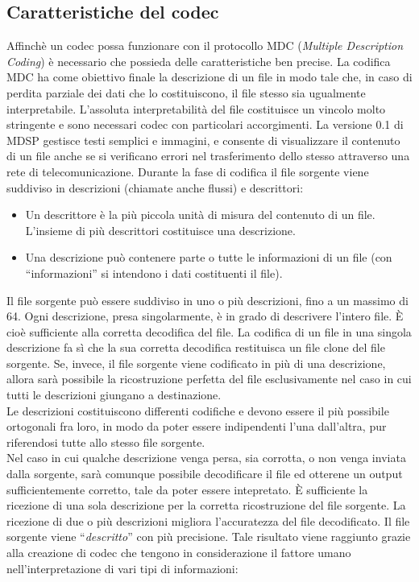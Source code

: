 \subsection{Caratteristiche del codec}
Affinch\`e un codec possa funzionare con il protocollo MDC (\emph{Multiple Description Coding}) è necessario che possieda delle caratteristiche ben precise. La codifica MDC ha come obiettivo finale la descrizione di un file in modo tale che, in caso di perdita parziale dei dati che lo costituiscono, il file stesso sia ugualmente interpretabile. L'assoluta interpretabilit\`a del file costituisce un vincolo molto stringente e sono necessari codec con particolari accorgimenti. La versione 0.1 di MDSP gestisce testi semplici e immagini, e consente di visualizzare il contenuto di un file anche se si verificano errori nel trasferimento dello stesso attraverso una rete di telecomunicazione. Durante la fase di codifica il file sorgente viene suddiviso in descrizioni (chiamate anche flussi) e descrittori:
\begin{itemize}
 \item Un descrittore \`e la pi\`u piccola unit\`a di misura del contenuto di un file. L'insieme di pi\`u descrittori costituisce una descrizione.
 \item Una descrizione pu\`o contenere parte o tutte le informazioni di un file (con ``informazioni'' si intendono i dati costituenti il file).
\end{itemize}
Il file sorgente pu\`o essere suddiviso in uno o pi\`u descrizioni, fino a un massimo di 64. Ogni descrizione, presa singolarmente, \`e in grado di descrivere l'intero file. \`E cio\`e sufficiente alla corretta decodifica del file. La codifica di un file in una singola descrizione fa s\`i che la sua corretta decodifica restituisca un file clone del file sorgente. Se, invece, il file sorgente viene codificato in pi\`u di una descrizione, allora sarà possibile la ricostruzione perfetta del file esclusivamente nel caso in cui tutti le descrizioni giungano a destinazione.
\\
Le descrizioni costituiscono differenti codifiche e devono essere il più possibile ortogonali fra loro, in modo da poter essere indipendenti l'una dall'altra, pur riferendosi tutte allo stesso file sorgente.
\\
Nel caso in cui qualche descrizione venga persa, sia corrotta, o non venga inviata dalla sorgente, sarà comunque possibile decodificare il file ed otterene un output sufficientemente corretto, tale da poter essere intepretato. \`E sufficiente la ricezione di una sola descrizione per la corretta ricostruzione del file sorgente. La ricezione di due o pi\`u descrizioni migliora l'accuratezza del file decodificato. Il file sorgente viene ``\emph{descritto}'' con pi\`u precisione.  Tale risultato viene raggiunto grazie alla creazione di codec che tengono in considerazione il fattore umano nell'interpretazione di vari tipi di informazioni:
